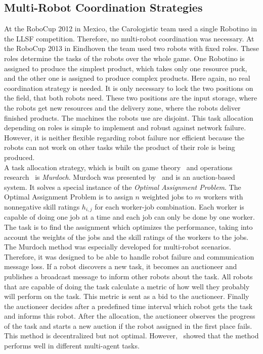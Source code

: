 \documentclass[a4paper,11pt]{article}
\begin{document}
\subsection{Multi-Robot Coordination Strategies}
At the RoboCup 2012 in Mexico, the Carologistic team used a single Robotino in the LLSF competition. Therefore, no multi-robot coordination was necessary. At the RoboCup 2013 in Eindhoven the team used two robots with fixed roles. These roles determine the tasks of the robots over the whole game. One Robotino is assigned to produce the simplest product, which takes only one resource puck, and the other one is assigned to produce complex products. Here again, no real coordination strategy is needed. It is only necessary to lock the two positions on the field, that both robots need. These two positions are the input storage, where the robots get new resources and the delivery zone, where the robots deliver finished products. The machines the robots use are disjoint. This task allocation depending on roles is simple to implement and robust against network failure. However, it is neither flexible regarding robot failure nor efficient because the robots can not work on other tasks while the product of their role is being produced.\\
A task allocation strategy, which is built on game theory~\cite{GameTheory} and operations research~\cite{OperationsResearch} is \textit{Murdoch}. Murdoch was presented by~\cite{DissMurdoch} and is an auction-based system. It solves a special instance of the \textit{Optimal Assignment Problem}. The Optimal Assignment Problem is to assign $n$ weighted jobs to $m$ workers with nonnegative skill ratings $h_{i,j}$ for each worker-job combination. Each worker is capable of doing one job at a time and each job can only be done by one worker. The task is to find the assignment which optimizes the performance, taking into account the weights of the jobs and the skill ratings of the workers to the jobs. The Murdoch method was especially developed 
for multi-robot scenarios. Therefore, it was designed to be able to handle robot failure and communication message loss. If a robot discovers a new task, it becomes an auctioneer and publishes a broadcast message to inform other robots about the task. All robots that are capable of doing the task calculate a metric of how well they probably will perform on the task. This metric is sent as a bid to the auctioneer. Finally the auctioneer decides after a predefined time interval which robot gets the task and informs this robot. After the allocation, the auctioneer observes the progress of the task and starts a new auction if the robot assigned in the first place fails. This method is decentralized but not optimal. However, \cite{DissMurdoch}~showed that the method performs well in different multi-agent tasks.\\
\end{document}
